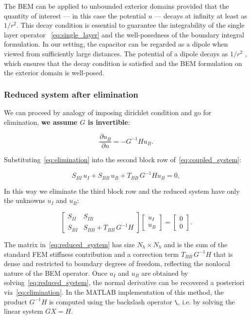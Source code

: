 \documentclass[11pt,onecolumn]{article}
\begin{document}
The BEM can be applied to unbounded exterior domains provided that the quantity of interest — in this case the potential $u$ — decays at infinity at least as $1/r^2$. This decay condition is essential to guarantee the integrability of the single layer operator ~\eqref{eq:single_layer} and the well-posedness of the boundary integral formulation. In our setting, the capacitor can be regarded as a dipole when viewed from sufficiently large distances. The potential of a dipole decays as $1/r^2$ \cite{potential_dipole}, which ensures that the decay condition is satisfied and the BEM formulation on the exterior domain is well-posed.


\subsubsection{Reduced system after elimination}

We can proceed by analogy of imposing dirichlet condition and go for elimination, \textbf{we assume $G$ is invertible}:

\begin{equation}
\frac{\partial u_B}{\partial n} = -G^{-1}H u_B.
\label{eq:elimination}
\end{equation}

Substituting~\eqref{eq:elimination} into the second block row of~\eqref{eq:coupled_system}:

\begin{equation}
S_{BI}\, u_I + S_{BB}\, u_B + T_{BB}\, G^{-1}H u_B = 0,
\end{equation}

In this way we eliminate the third block row and the reduced system have only the unknowns $u_I$ and $u_B$:

\begin{equation}
\begin{bmatrix}
S_{II} & S_{IB} \\
S_{BI} & S_{BB} + T_{BB}\, G^{-1}H
\end{bmatrix}
\begin{bmatrix}
u_I \\ u_B
\end{bmatrix}
=
\begin{bmatrix}
0 \\ 0
\end{bmatrix}.
\label{eq:reduced_system}
\end{equation}

The matrix in~\eqref{eq:reduced_system} has size $N_h \times N_h$ and is the sum of the standard FEM stiffness contribution and a correction term $T_{BB}\, G^{-1}H$ that is dense and restricted to boundary degrees of freedom, reflecting the nonlocal nature of the BEM operator. Once $u_I$ and $u_B$ are obtained by solving~\eqref{eq:reduced_system}, the normal derivative can be recovered a posteriori via~\eqref{eq:elimination}.
 In the MATLAB implementation of this method, the product $G^{-1}H$ is computed using the backslash operator \texttt{\textbackslash}, i.e. by solving the linear system $GX = H$.
\end{document}
